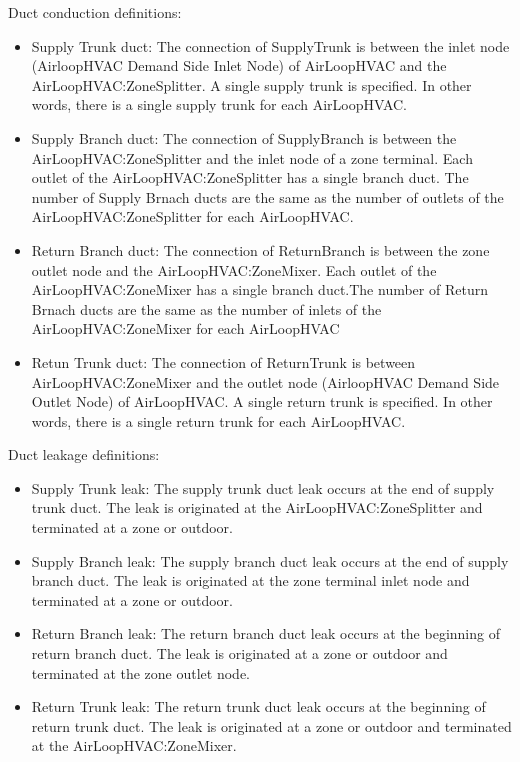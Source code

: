 Duct conduction definitions:

\begin{itemize}
\item
 Supply Trunk duct: The connection of SupplyTrunk is between the inlet node (AirloopHVAC Demand Side Inlet Node) of AirLoopHVAC and the AirLoopHVAC:ZoneSplitter. A single supply trunk is specified. In other words, there is a single supply trunk for each AirLoopHVAC.
\item
 Supply Branch duct: The connection of SupplyBranch is between the AirLoopHVAC:ZoneSplitter and the inlet node of a zone terminal. Each outlet of the AirLoopHVAC:ZoneSplitter has a single branch duct. The number of Supply Brnach ducts are the same as the number of outlets of the AirLoopHVAC:ZoneSplitter for each AirLoopHVAC.
\item
 Return Branch duct: The connection of ReturnBranch is between the zone outlet node and the AirLoopHVAC:ZoneMixer.  Each outlet of the AirLoopHVAC:ZoneMixer has a single branch duct.The number of Return Brnach ducts are the same as the number of inlets of the AirLoopHVAC:ZoneMixer for each AirLoopHVAC
\item
 Retun Trunk duct: The connection of ReturnTrunk is between AirLoopHVAC:ZoneMixer and the outlet node (AirloopHVAC Demand Side Outlet Node) of AirLoopHVAC. A single return trunk is specified. In other words, there is a single return trunk for each AirLoopHVAC.
\end{itemize}
 
Duct leakage definitions:

\begin{itemize}
\item
  Supply Trunk leak: The supply trunk duct leak occurs at the end of supply trunk duct. The leak is originated at the AirLoopHVAC:ZoneSplitter and terminated at a zone or outdoor.
\item
  Supply Branch leak: The supply branch duct leak occurs at the end of supply branch duct. The leak is originated at the zone terminal inlet node and terminated at a zone or outdoor.
\item
  Return Branch leak: The return branch duct leak occurs at the beginning of return branch duct. The leak is originated at a zone or outdoor and terminated at the zone outlet node.
\item
  Return Trunk leak: The return trunk duct leak occurs at the beginning of return trunk duct. The leak is originated at a zone or outdoor and terminated at the AirLoopHVAC:ZoneMixer.

\end{itemize}


